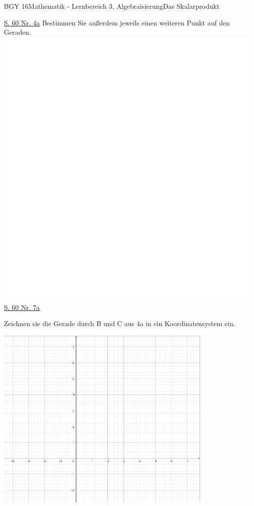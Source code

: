 \documentclass[oneside,openany,headings=optiontotoc,11pt,numbers=noenddot]{scrreprt}
\begin{document}
	\begin{worksheet}{BGY 16}{Mathematik - Lernbereich 3, Algebraisierung}{Das Skalarprodukt}
		
		\begin{framed}
			\noindent
			\underline{S. 60 Nr. 4a} Bestimmen Sie außerdem jeweils einen weiteren Punkt auf den Geraden.\\
			\includegraphics[scale=0.58]{../empty.jpg}\\
			\underline{S. 60 Nr. 7a}
		\end{framed}		
		\begin{framed}
			\noindent
			Zeichnen sie die Gerade durch B und C aus 4a in ein Koordinatensystem ein.
			\begin{center}
				\includegraphics[width=0.8\textwidth]{Bilder/Koord.jpg}\\
			\end{center}
		\end{framed}
		

\end{worksheet}
\end{document}
